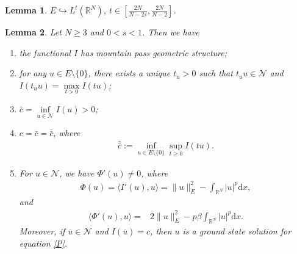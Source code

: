 \documentclass[10pt,a4paper]{amsart}
\newtheorem{lemma}{Lemma}
\begin{document}
\begin{lemma}\label{Lemma2.2}
$E\hookrightarrow L^{t}(\mathbb{R}^{N})$, $t\in [\frac{2N}{N-2s},\frac{2N}{N-2}]$.
\end{lemma}

\begin{lemma}\label{Lemma4.1}
Let $N\geqslant3$ and $0<s<1$.
Then we have

\begin{enumerate}
\item [(1)]
the functional $I$ has mountain pass geometric structure;


\item [(2)]
for any $u\in E\setminus\{0\}$, there exists a unique $t_{u}>0$ such that $t_{u}u\in \mathcal{N}$ and $I(t_{u}u)=\max\limits_{t>0}I(tu)$;

\item [(3)]
 $\bar{c}=\inf\limits_{u\in\mathcal{N}}I(u)>0$;

\item [(4)]
$c=\bar{c}=\bar{\bar{c}}$,
where
\begin{equation*}
\begin{aligned}
\bar{\bar{c}}:=\inf\limits_{u\in E\setminus\{0\}}\sup\limits_{t\geqslant 0}I(tu).
\end{aligned}
\end{equation*}

\item [(5)]
For $u\in \mathcal{N}$, we have $\Phi'(u)\not=0$, where
\begin{equation}\label{4.1}
\begin{aligned}
\Phi(u)=\langle I'(u),u\rangle=\|u\|_{E}^{2}-\int_{\mathbb{R}^{N}}|u|^{p}\mathrm{d}x,
\end{aligned}
\end{equation}
and
\begin{equation}\label{4.2}
\begin{aligned}
\langle\Phi'(u),u\rangle
=&2\|u\|_{E}^{2}
-p\beta\int_{\mathbb{R}^{N}}|u|^{p}\mathrm{d}x.
\end{aligned}
\end{equation}
Moreover, if $\bar{u}\in \mathcal{N}$ and $I(\bar{u})=c$, then $u$ is a ground state solution for equation \eqref{P}.
\end{enumerate}
\end{lemma}
\end{document}
